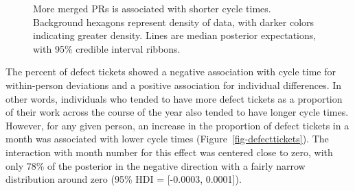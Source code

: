 \documentclass[manuscript,screen,review]{acmart}
\begin{document}
\begin{figure}


\caption[More merged PRs is associated with shorter cycle
times]{\label{fig-mergedprs}More merged PRs is associated with shorter
cycle times. Background hexagons represent density of data, with darker
colors indicating greater density. Lines are median posterior
expectations, with 95\% credible interval ribbons.}

\end{figure}%

The percent of defect tickets showed a negative association with cycle
time for within-person deviations and a positive association for
individual differences. In other words, individuals who tended to have
more defect tickets as a proportion of their work across the course of
the year also tended to have longer cycle times. However, for any given
person, an increase in the proportion of defect tickets in a month was
associated with lower cycle times (Figure~\ref{fig-defecttickets}). The
interaction with month number for this effect was centered close to
zero, with only 78\% of the posterior in the negative direction with a
fairly narrow distribution around zero (95\% HDI = {[}-0.0003,
0.0001{]}).
\end{document}

